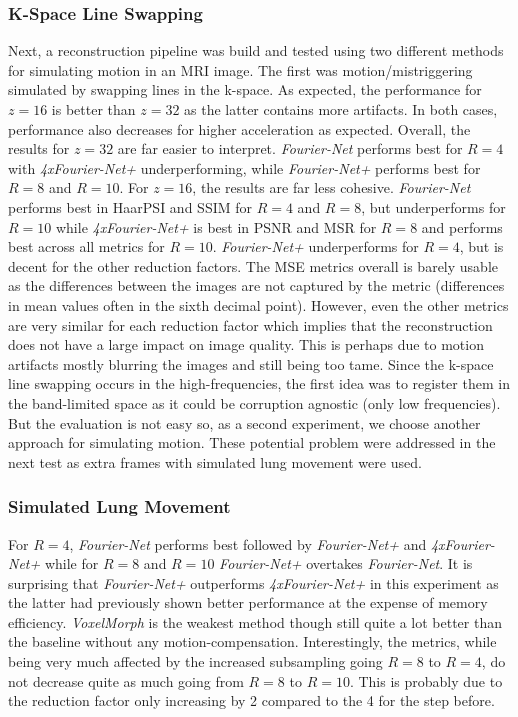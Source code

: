 \subsubsection{K-Space Line Swapping}
Next, a reconstruction pipeline was build and tested using two different methods for simulating motion in an MRI image. The first was motion/mistriggering simulated by swapping lines in the k-space. As expected, the performance for $z=16$ is better than $z=32$ as the latter contains more artifacts. In both cases, performance also decreases for higher acceleration as expected. Overall, the results for $z=32$ are far easier to interpret. \emph{Fourier-Net} performs best for $R=4$ with \emph{4xFourier-Net+} underperforming, while \emph{Fourier-Net+} performs best for $R=8$ and $R=10$. For $z=16$, the results are far less cohesive. \emph{Fourier-Net} performs best in HaarPSI and SSIM for $R=4$ and $R=8$, but underperforms for $R=10$ while \emph{4xFourier-Net+} is best in PSNR and MSR for $R=8$ and performs best across all metrics for $R=10$. \emph{Fourier-Net+} underperforms for $R=4$, but is decent for the other reduction factors. The MSE metrics overall is barely usable as the differences between the images are not captured by the metric (differences in mean values often in the sixth decimal point). However, even the other metrics are very similar for each reduction factor which implies that the reconstruction does not have a large impact on image quality. This is perhaps due to motion artifacts mostly blurring the images and still being too tame. Since the k-space line swapping occurs in the high-frequencies, the first idea was to register them in the band-limited space as it could be corruption agnostic (only low frequencies). But the evaluation is not easy so, as a second experiment, we choose another approach for simulating motion. These potential problem were addressed in the next test as extra frames with simulated lung movement were used.

\subsubsection{Simulated Lung Movement}
For $R=4$, \emph{Fourier-Net} performs best followed by \emph{Fourier-Net+} and \emph{4xFourier-Net+} while for $R=8$ and $R=10$ \emph{Fourier-Net+} overtakes \emph{Fourier-Net}. It is surprising that \emph{Fourier-Net+} outperforms \emph{4xFourier-Net+} in this experiment as the latter had previously shown better performance at the expense of memory efficiency. \emph{VoxelMorph} is the weakest method though still quite a lot better than the baseline without any motion-compensation. Interestingly, the metrics, while being very much affected by the increased subsampling going $R=8$ to $R=4$, do not decrease quite as much going from $R=8$ to $R=10$. This is probably due to the reduction factor only increasing by 2 compared to the 4 for the step before. 


